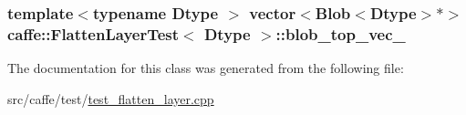 \hypertarget{classcaffe_1_1_flatten_layer_test_aacf4562ee42d8d7a3336b0f5f7e1cfc1}{
\subsubsection[{blob\+\_\+top\+\_\+vec\+\_\+}]{\setlength{\rightskip}{0pt plus 5cm}template$<$typename Dtype $>$ vector$<${\bf Blob}$<$Dtype$>$$\ast$$>$ {\bf caffe\+::\+Flatten\+Layer\+Test}$<$ Dtype $>$\+::blob\+\_\+top\+\_\+vec\+\_\+\hspace{0.3cm}{\ttfamily [protected]}}}\label{classcaffe_1_1_flatten_layer_test_aacf4562ee42d8d7a3336b0f5f7e1cfc1}


The documentation for this class was generated from the following file\+:\begin{DoxyCompactItemize}
\item 
src/caffe/test/\hyperlink{test__flatten__layer_8cpp}{test\+\_\+flatten\+\_\+layer.\+cpp}\end{DoxyCompactItemize}
